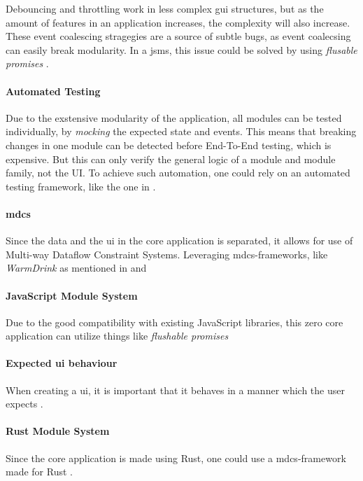 Debouncing and throttling work in less complex \gls{gui} structures, but as the
amount of features in an application increases, the complexity will also
increase. These event coalescing stragegies are a source of subtle bugs, as
event coalecsing can easily break modularity. In a \gls{jsms}, this issue could
be solved by using \textit{flusable promises} \cite{flush}.

\paragraph{Automated Testing} Due to the exstensive modularity of the
application, all modules can be tested individually, by \textit{mocking} the
expected state and events. This means that breaking changes in one module can be
detected before End-To-End testing, which is expensive. 
But this can only verify the general logic of a module and module family, not
the UI. To achieve such automation, one could rely on an automated testing
framework, like the one in \cite{autoUi}.

\paragraph{\gls{mdcs}} Since the data and the \gls{ui}
in the core application is separated, it allows for use of Multi-way Dataflow
Constraint Systems. Leveraging \gls{mdcs}-frameworks, like \textit{WarmDrink} as
mentioned in \cite{warmDrink} and \cite{dslMdcs}

\paragraph{JavaScript Module System} Due to the good compatibility with existing
JavaScript libraries, this zero core application can utilize things like
\textit{flushable promises} \cite{flush}

\paragraph{Expected \gls{ui} behaviour} When creating a \gls{ui}, it is
important that it behaves in a manner which the user expects \cite{leastGui}.

\paragraph{Rust Module System} Since the core application is made using Rust,
one could use a \gls{mdcs}-framework made for Rust \cite{mcdsRust}.

